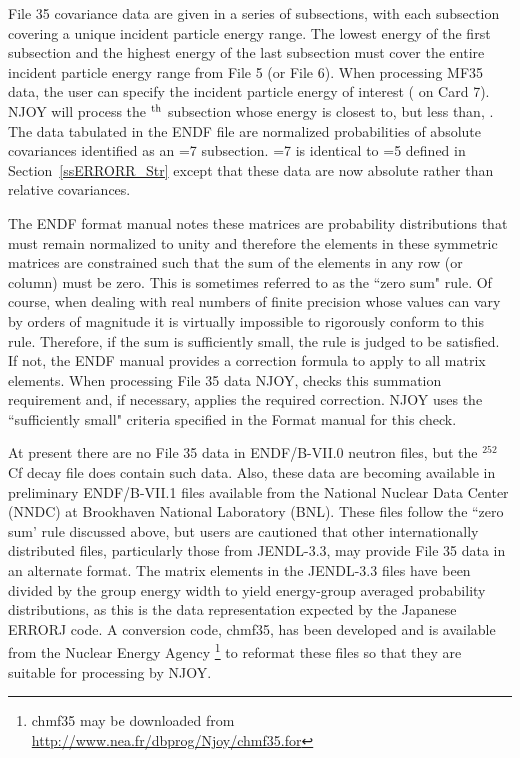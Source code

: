 File 35 covariance data are given in a series of  subsections,
with each subsection covering a unique incident particle energy range.
The lowest energy of the first subsection and the highest energy of
the last subsection must cover the entire incident particle energy
range from File 5 (or File 6).  When processing MF35 data, the user
can specify the incident particle energy of interest (
on Card 7).  NJOY will process the $^{\rm th}$ subsection whose
energy is closest to, but less than, .  The data
tabulated in the ENDF file are normalized probabilities of absolute
covariances identified as an =7 subsection.  =7
is identical to =5 defined in Section~\ref{ssERRORR_Str}
except that these data are now absolute rather than relative covariances.

The ENDF format manual notes these matrices are probability distributions
that must remain normalized to unity and therefore the elements in these
symmetric matrices are constrained such that the sum of the elements
in any row (or column) must be zero.  This is sometimes referred to as
the ``zero sum" rule.  Of course, when dealing with real
numbers of finite precision whose values can vary by orders of magnitude
it is virtually impossible to rigorously conform to this rule.
Therefore, if the sum is sufficiently small, the rule is judged to be
satisfied.  If not, the ENDF manual provides a correction formula
to apply to all matrix elements.  When processing File 35 data NJOY,
checks this summation requirement and, if necessary, applies the
required correction.  NJOY uses the ``sufficiently small" criteria
specified in the Format manual for this check.

At present there are no File 35 data in ENDF/B-VII.0 neutron files,
but the $^{252}$Cf decay file does contain such data.  Also, these data
are becoming available in preliminary ENDF/B-VII.1 files available from
the National Nuclear Data Center (NNDC) at Brookhaven
National Laboratory (BNL).  These files follow
the ``zero sum' rule discussed above, but users are cautioned that
other internationally distributed files, particularly those from
JENDL-3.3, may provide File 35 data in an alternate format.  The
matrix elements in the JENDL-3.3 files have been divided by the
group energy width to yield energy-group averaged probability
distributions, as this is the data representation expected by the
Japanese ERRORJ code\cite{ERRORJ}.  A conversion code,
chmf35, has been developed and is available from the Nuclear Energy Agency
\footnote{chmf35 may be downloaded from
\href{http://www.nea.fr/dbprog/Njoy/chmf35.for}
{http://www.nea.fr/dbprog/Njoy/chmf35.for}}
to reformat these files
so that they are suitable for processing by NJOY.

